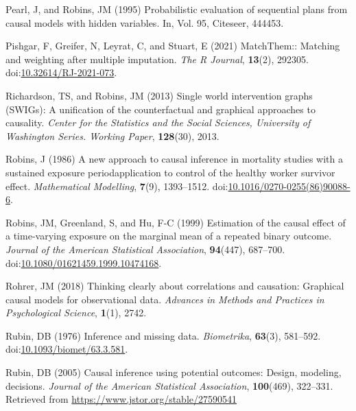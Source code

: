 \documentclass[
  singlecolumn]{article}
\newlength{\cslhangindent}
\newlength{\cslentryspacingunit} %
\newenvironment{CSLReferences}[2] %
 {%
  \setlength{\parindent}{0pt}
  \ifodd #1
  \let\oldpar\par
  \def\par{\hangindent=\cslhangindent\oldpar}
  \fi
  \setlength{\parskip}{#2\cslentryspacingunit}
 }%
 {}
\begin{document}
\begin{CSLReferences}{1}{0}
\leavevmode{}%
Pearl, J, and Robins, JM (1995) Probabilistic evaluation of sequential
plans from causal models with hidden variables. In, Vol. 95, Citeseer,
444453.

\leavevmode{}%
Pishgar, F, Greifer, N, Leyrat, C, and Stuart, E (2021) MatchThem::
Matching and weighting after multiple imputation. \emph{The R Journal},
\textbf{13}(2), 292305.
doi:\href{https://doi.org/10.32614/RJ-2021-073}{10.32614/RJ-2021-073}.

\leavevmode{}%
Richardson, TS, and Robins, JM (2013) Single world intervention graphs
(SWIGs): A unification of the counterfactual and graphical approaches to
causality. \emph{Center for the Statistics and the Social Sciences,
University of Washington Series. Working Paper}, \textbf{128}(30), 2013.

\leavevmode{}%
Robins, J (1986) A new approach to causal inference in mortality studies
with a sustained exposure period{\textemdash}application to control of
the healthy worker survivor effect. \emph{Mathematical Modelling},
\textbf{7}(9), 1393--1512.
doi:\href{https://doi.org/10.1016/0270-0255(86)90088-6}{10.1016/0270-0255(86)90088-6}.

\leavevmode{}%
Robins, JM, Greenland, S, and Hu, F-C (1999) Estimation of the causal
effect of a time-varying exposure on the marginal mean of a repeated
binary outcome. \emph{Journal of the American Statistical Association},
\textbf{94}(447), 687--700.
doi:\href{https://doi.org/10.1080/01621459.1999.10474168}{10.1080/01621459.1999.10474168}.

\leavevmode{}%
Rohrer, JM (2018) Thinking clearly about correlations and causation:
Graphical causal models for observational data. \emph{Advances in
Methods and Practices in Psychological Science}, \textbf{1}(1), 2742.

\leavevmode{}%
Rubin, DB (1976) Inference and missing data. \emph{Biometrika},
\textbf{63}(3), 581--592.
doi:\href{https://doi.org/10.1093/biomet/63.3.581}{10.1093/biomet/63.3.581}.

\leavevmode{}%
Rubin, DB (2005) Causal inference using potential outcomes: Design,
modeling, decisions. \emph{Journal of the American Statistical
Association}, \textbf{100}(469), 322--331. Retrieved from
\url{https://www.jstor.org/stable/27590541}


\end{CSLReferences}
\end{document}
